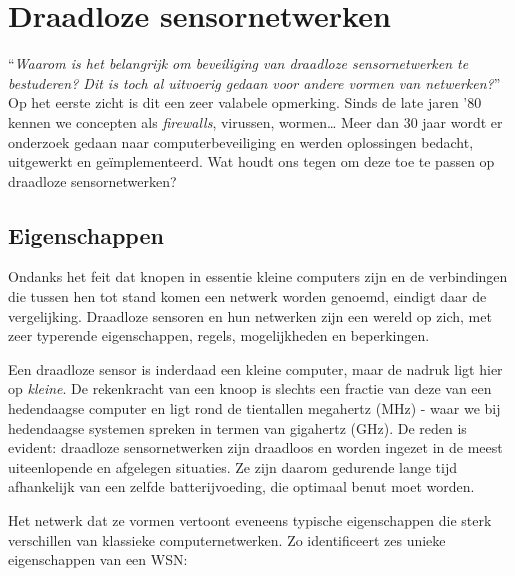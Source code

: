 
\section{Draadloze sensornetwerken}
\label{section:landscape}

``\emph{Waarom is het belangrijk om beveiliging van draadloze sensornetwerken
te bestuderen? Dit is toch al uitvoerig gedaan voor andere vormen van
netwerken?}'' Op het eerste zicht is dit een zeer valabele opmerking. Sinds de
late jaren '80 kennen we concepten als \emph{firewalls}, virussen, wormen\dots
Meer dan 30 jaar wordt er onderzoek gedaan naar computerbeveiliging en werden
oplossingen bedacht, uitgewerkt en ge\"implementeerd. Wat houdt ons tegen om
deze toe te passen op draadloze sensornetwerken?

\subsection{Eigenschappen}

Ondanks het feit dat knopen in essentie kleine computers zijn en de
verbindingen die tussen hen tot stand komen een netwerk worden genoemd, eindigt
daar de vergelijking. Draadloze sensoren en hun netwerken zijn een wereld op
zich, met zeer typerende eigenschappen, regels, mogelijkheden en beperkingen.

Een draadloze sensor is inderdaad een kleine computer, maar de nadruk ligt hier
op \emph{kleine}. De rekenkracht van een knoop is slechts een fractie van deze
van een hedendaagse computer en ligt rond de tientallen megahertz (MHz) - waar
we bij hedendaagse systemen spreken in termen van gigahertz (GHz). De reden is
evident: draadloze sensornetwerken zijn draadloos en worden ingezet in de meest
uiteenlopende en afgelegen situaties. Ze zijn daarom gedurende lange tijd
afhankelijk van een zelfde batterijvoeding, die optimaal benut moet worden.

Het netwerk dat ze vormen vertoont eveneens typische eigenschappen die sterk
verschillen van klassieke computernetwerken. Zo identificeert
\citep{blilat2012wireless} zes unieke eigenschappen van een WSN:

